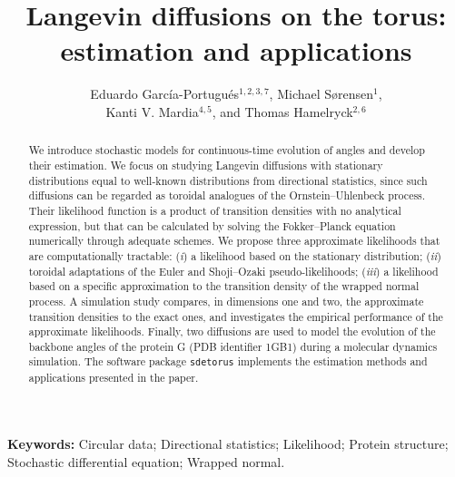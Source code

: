 \documentclass[oneside,11pt]{article}
\newif\ifmain
\begin{document}
\ifmain

\title{Langevin diffusions on the torus: estimation and applications}
\setlength{\droptitle}{-1cm}
\predate{}%
\postdate{}%

\date{}

\author{Eduardo Garc\'ia-Portugu\'es$^{1,2,3,7}$, Michael S\o rensen$^{1}$,\\ Kanti V. Mardia$^{4,5}$, and Thomas Hamelryck$^{2,6}$}


\maketitle


\begin{abstract}
We introduce stochastic models for contin\-u\-ous-time evolution of angles and develop their estimation. We focus on studying Langevin diffusions with stationary distributions equal to well-known distributions from directional statistics, since such diffusions can be regarded as toroidal analogues of the Ornstein--Uhlenbeck process. Their likelihood function is a product of transition densities with no analytical expression, but that can be calculated by solving the Fokker--Planck equation numerically through adequate schemes. We propose three approximate likelihoods that are computationally tractable: (\textit{i}) a likelihood based on the stationary distribution; (\textit{ii}) toroidal adaptations of the Euler and Shoji--Ozaki pseudo-likelihoods; (\textit{iii}) a likelihood based on a specific approximation to the transition density of the wrapped normal process. A simulation study compares, in dimensions one and two, the approximate transition densities to the exact ones, and investigates the empirical performance of the approximate likelihoods. Finally, two diffusions are used to model the evolution of the backbone angles of the protein G (PDB identifier 1GB1) during a molecular dynamics simulation. The software package \texttt{sdetorus} implements the estimation methods and applications presented in the paper.
\end{abstract}
\begin{flushleft}
\small\textbf{Keywords:} Circular data; Directional statistics; Likelihood; Protein structure; Stochastic differential equation; Wrapped normal.
\end{flushleft}
\end{document}

